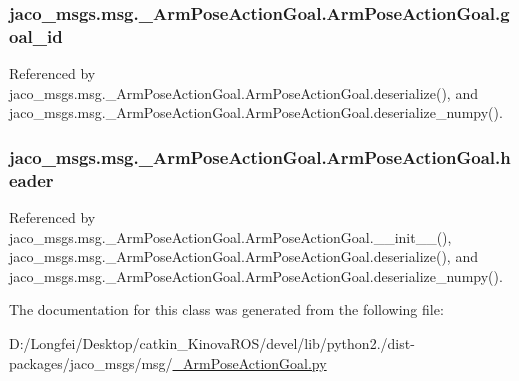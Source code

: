 \subsubsection[{\texorpdfstring{goal\+\_\+id}{goal_id}}]{\setlength{\rightskip}{0pt plus 5cm}jaco\+\_\+msgs.\+msg.\+\_\+\+Arm\+Pose\+Action\+Goal.\+Arm\+Pose\+Action\+Goal.\+goal\+\_\+id}\hypertarget{classjaco__msgs_1_1msg_1_1__ArmPoseActionGoal_1_1ArmPoseActionGoal_ae3ea72079050262cb7aa3631b06a3d90}{}\label{classjaco__msgs_1_1msg_1_1__ArmPoseActionGoal_1_1ArmPoseActionGoal_ae3ea72079050262cb7aa3631b06a3d90}


Referenced by jaco\+\_\+msgs.\+msg.\+\_\+\+Arm\+Pose\+Action\+Goal.\+Arm\+Pose\+Action\+Goal.\+deserialize(), and jaco\+\_\+msgs.\+msg.\+\_\+\+Arm\+Pose\+Action\+Goal.\+Arm\+Pose\+Action\+Goal.\+deserialize\+\_\+numpy().

\subsubsection[{\texorpdfstring{header}{header}}]{\setlength{\rightskip}{0pt plus 5cm}jaco\+\_\+msgs.\+msg.\+\_\+\+Arm\+Pose\+Action\+Goal.\+Arm\+Pose\+Action\+Goal.\+header}\hypertarget{classjaco__msgs_1_1msg_1_1__ArmPoseActionGoal_1_1ArmPoseActionGoal_a5306d39d1f1d9fac907a1be35d8f3a61}{}\label{classjaco__msgs_1_1msg_1_1__ArmPoseActionGoal_1_1ArmPoseActionGoal_a5306d39d1f1d9fac907a1be35d8f3a61}


Referenced by jaco\+\_\+msgs.\+msg.\+\_\+\+Arm\+Pose\+Action\+Goal.\+Arm\+Pose\+Action\+Goal.\+\_\+\+\_\+init\+\_\+\+\_\+(), jaco\+\_\+msgs.\+msg.\+\_\+\+Arm\+Pose\+Action\+Goal.\+Arm\+Pose\+Action\+Goal.\+deserialize(), and jaco\+\_\+msgs.\+msg.\+\_\+\+Arm\+Pose\+Action\+Goal.\+Arm\+Pose\+Action\+Goal.\+deserialize\+\_\+numpy().



The documentation for this class was generated from the following file\+:\begin{DoxyCompactItemize}
\item 
D\+:/\+Longfei/\+Desktop/catkin\+\_\+\+Kinova\+R\+O\+S/devel/lib/python2./dist-\/packages/jaco\+\_\+msgs/msg/\hyperlink{__ArmPoseActionGoal_8py}{\+\_\+\+Arm\+Pose\+Action\+Goal.\+py}\end{DoxyCompactItemize}
